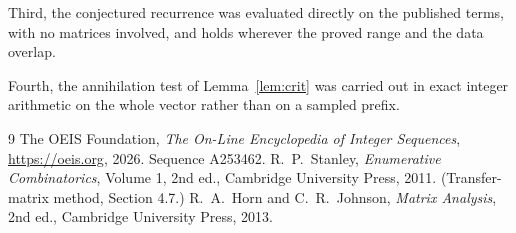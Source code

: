 \documentclass[11pt,a4paper]{article}
\theoremstyle{plain}
\theoremstyle{definition}
\begin{document}
Third, the conjectured recurrence was evaluated directly on the published terms, with no
matrices involved, and holds wherever the proved range and the data overlap.

Fourth, the annihilation test of Lemma~\ref{lem:crit} was carried out in exact integer
arithmetic on the whole vector rather than on a sampled prefix.

\begin{thebibliography}{9}
 The OEIS Foundation, \emph{The On-Line Encyclopedia of Integer
Sequences}, \url{https://oeis.org}, 2026. Sequence A253462.
 R.~P.~Stanley, \emph{Enumerative Combinatorics}, Volume 1, 2nd ed.,
Cambridge University Press, 2011. (Transfer-matrix method, Section 4.7.)
 R.~A.~Horn and C.~R.~Johnson, \emph{Matrix Analysis}, 2nd ed., Cambridge
University Press, 2013.
\end{thebibliography}
\end{document}
